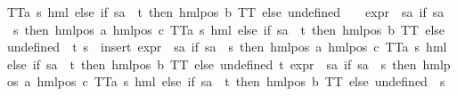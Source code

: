 \begin{isabellebody}
{\isacharparenleft}{\kern0pt}TT{\isacharcolon}{\kern0pt}{\isacharcolon}{\kern0pt}{\isacharparenleft}{\kern0pt}{\isacharprime}{\kern0pt}a{\isacharcomma}{\kern0pt}\ {\isacharprime}{\kern0pt}s{\isacharparenright}{\kern0pt}\ hml{\isacharparenright}{\kern0pt}{\isacharparenright}{\kern0pt}\ else\ if\ sa\ {\isacharequal}{\kern0pt}\ t\ then\ hml{\isacharunderscore}{\kern0pt}pos\ b\ TT\ else\ undefined{\isacharparenright}{\kern0pt}{\isacharparenright}{\kern0pt}\ {\isacharbackquote}{\kern0pt}\ {\isacharbraceleft}{\kern0pt}{\isacharbraceright}{\kern0pt}\ {\isasymunion}\ {\isacharparenleft}{\kern0pt}expr{\isacharunderscore}{\kern0pt}{}\ {\isasymcirc}\ {\isacharparenleft}{\kern0pt}{\isasymlambda}sa{\isachardot}{\kern0pt}\ if\ sa\ {\isacharequal}{\kern0pt}\ s\ then\ hml{\isacharunderscore}{\kern0pt}pos\ a\ {\isacharparenleft}{\kern0pt}hml{\isacharunderscore}{\kern0pt}pos\ c\ {\isacharparenleft}{\kern0pt}TT{\isacharcolon}{\kern0pt}{\isacharcolon}{\kern0pt}{\isacharparenleft}{\kern0pt}{\isacharprime}{\kern0pt}a{\isacharcomma}{\kern0pt}\ {\isacharprime}{\kern0pt}s{\isacharparenright}{\kern0pt}\ hml{\isacharparenright}{\kern0pt}{\isacharparenright}{\kern0pt}\ else\ if\ sa\ {\isacharequal}{\kern0pt}\ t\ then\ hml{\isacharunderscore}{\kern0pt}pos\ b\ TT\ else\ undefined{\isacharparenright}{\kern0pt}{\isacharparenright}{\kern0pt}\ {\isacharbackquote}{\kern0pt}\ {\isacharbraceleft}{\kern0pt}t{\isacharcomma}{\kern0pt}\ s{\isacharbraceright}{\kern0pt}\ {\isasymunion}\ insert\ {\isacharparenleft}{\kern0pt}{\isacharparenleft}{\kern0pt}expr{\isacharunderscore}{\kern0pt}{}\ {\isasymcirc}\ {\isacharparenleft}{\kern0pt}{\isasymlambda}sa{\isachardot}{\kern0pt}\ if\ sa\ {\isacharequal}{\kern0pt}\ s\ then\ hml{\isacharunderscore}{\kern0pt}pos\ a\ {\isacharparenleft}{\kern0pt}hml{\isacharunderscore}{\kern0pt}pos\ c\ {\isacharparenleft}{\kern0pt}TT{\isacharcolon}{\kern0pt}{\isacharcolon}{\kern0pt}{\isacharparenleft}{\kern0pt}{\isacharprime}{\kern0pt}a{\isacharcomma}{\kern0pt}\ {\isacharprime}{\kern0pt}s{\isacharparenright}{\kern0pt}\ hml{\isacharparenright}{\kern0pt}{\isacharparenright}{\kern0pt}\ else\ if\ sa\ {\isacharequal}{\kern0pt}\ t\ then\ hml{\isacharunderscore}{\kern0pt}pos\ b\ TT\ else\ undefined{\isacharparenright}{\kern0pt}{\isacharparenright}{\kern0pt}\ t{\isacharparenright}{\kern0pt}\ {\isacharparenleft}{\kern0pt}{\isacharparenleft}{\kern0pt}expr{\isacharunderscore}{\kern0pt}{}\ {\isasymcirc}\ {\isacharparenleft}{\kern0pt}{\isasymlambda}sa{\isachardot}{\kern0pt}\ if\ sa\ {\isacharequal}{\kern0pt}\ s\ then\ hml{\isacharunderscore}{\kern0pt}pos\ a\ {\isacharparenleft}{\kern0pt}hml{\isacharunderscore}{\kern0pt}pos\ c\ {\isacharparenleft}{\kern0pt}TT{\isacharcolon}{\kern0pt}{\isacharcolon}{\kern0pt}{\isacharparenleft}{\kern0pt}{\isacharprime}{\kern0pt}a{\isacharcomma}{\kern0pt}\ {\isacharprime}{\kern0pt}s{\isacharparenright}{\kern0pt}\ hml{\isacharparenright}{\kern0pt}{\isacharparenright}{\kern0pt}\ else\ if\ sa\ {\isacharequal}{\kern0pt}\ t\ then\ hml{\isacharunderscore}{\kern0pt}pos\ b\ TT\ else\ undefined{\isacharparenright}{\kern0pt}{\isacharparenright}{\kern0pt}\ {\isacharbackquote}{\kern0pt}\ {\isacharbraceleft}{\kern0pt}s{\isacharbraceright}{\kern0pt}{\isacharparenright}{\kern0pt}{\isachardoublequoteclose}\isanewline

\end{isabellebody}
